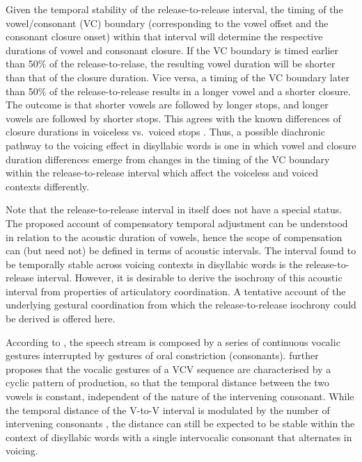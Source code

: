 \documentclass[
  12pt,
  a4paper,
  authoryear, 5p]{elsarticle}
\begin{document}
Given the temporal stability of the release-to-release interval, the
timing of the vowel/consonant (VC) boundary (corresponding to the vowel
offset and the consonant closure onset) within that interval will
determine the respective durations of vowel and consonant closure. If
the VC boundary is timed earlier than 50\% of the release-to-relase, the
resulting vowel duration will be shorter than that of the closure
duration. Vice versa, a timing of the VC boundary later than 50\% of the
release-to-release results in a longer vowel and a shorter closure. The
outcome is that shorter vowels are followed by longer stops, and longer
vowels are followed by shorter stops. This agrees with the known
differences of closure durations in voiceless vs.~voiced stops
\citep{lisker1957, van-summers1987, davis1989, de-jong1991}. Thus, a
possible diachronic pathway to the voicing effect in disyllabic words is
one in which vowel and closure duration differences emerge from changes
in the timing of the VC boundary within the release-to-release interval
which affect the voiceless and voiced contexts differently.

Note that the release-to-release interval in itself does not have a
special status. The proposed account of compensatory temporal adjustment
can be understood in relation to the acoustic duration of vowels, hence
the scope of compensation can (but need not) be defined in terms of
acoustic intervals. The interval found to be temporally stable across
voicing contexts in disyllabic words is the release-to-release interval.
However, it is desirable to derive the isochrony of this acoustic
interval from properties of articulatory coordination. A tentative
account of the underlying gestural coordination from which the
release-to-release isochrony could be derived is offered here.

According to \citet{ohman1966, ohman1967}, the speech stream is composed
by a series of continuous vocalic gestures interrupted by gestures of
oral constriction (consonants). \citet{fowler1983} further proposes that
the vocalic gestures of a VCV sequence are characterised by a cyclic
pattern of production, so that the temporal distance between the two
vowels is constant, independent of the nature of the intervening
consonant. While the temporal distance of the V-to-V interval is
modulated by the number of intervening consonants
\citep{zmarich2011, zeroual2015}, the distance can still be expected to
be stable within the context of disyllabic words with a single
intervocalic consonant that alternates in voicing.
\end{document}

